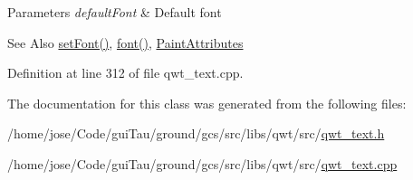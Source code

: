 \begin{DoxyParams}{Parameters}
{\em default\-Font} & Default font \\
\hline
\end{DoxyParams}
\begin{DoxySeeAlso}{See Also}
\hyperlink{class_qwt_text_ad071f3c4fae4512a1cc71554d95eb69a}{set\-Font()}, \hyperlink{class_qwt_text_a76db41eeae98fbfa0933a38328a240ac}{font()}, \hyperlink{class_qwt_text_a0d239ca5c8e0cd3c748325ad453bb13f}{Paint\-Attributes} 
\end{DoxySeeAlso}


Definition at line 312 of file qwt\-\_\-text.\-cpp.



The documentation for this class was generated from the following files\-:\begin{DoxyCompactItemize}
\item 
/home/jose/\-Code/gui\-Tau/ground/gcs/src/libs/qwt/src/\hyperlink{qwt__text_8h}{qwt\-\_\-text.\-h}\item 
/home/jose/\-Code/gui\-Tau/ground/gcs/src/libs/qwt/src/\hyperlink{qwt__text_8cpp}{qwt\-\_\-text.\-cpp}\end{DoxyCompactItemize}
